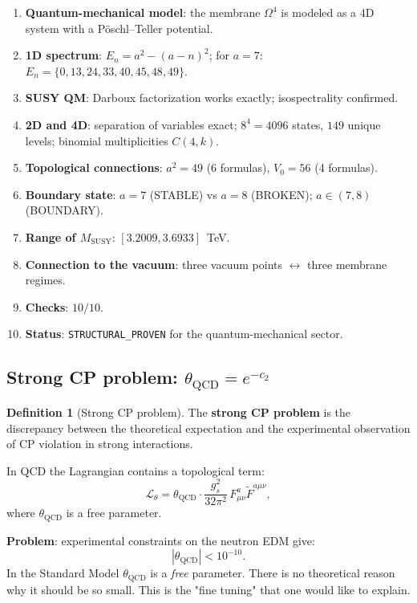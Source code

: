 \documentclass[11pt,a4paper]{article}
\newcommand{\Om}{\ensuremath{\Omega^4}}
\theoremstyle{definition}
\newtheorem{definition}[theorem]{Definition}
\begin{document}
\begin{enumerate}
    \item \textbf{Quantum-mechanical model}: the membrane $\Om$
          is modeled as a 4D system with a P\"oschl--Teller potential.
    \item \textbf{1D spectrum}: $E_n = a^2 - (a-n)^2$;
          for $a = 7$: $E_n = \{0, 13, 24, 33, 40, 45, 48, 49\}$.
    \item \textbf{SUSY QM}: Darboux factorization works exactly;
          isospectrality confirmed.
    \item \textbf{2D and 4D}: separation of variables exact;
          $8^4 = 4096$ states, $149$ unique levels;
          binomial multiplicities $C(4, k)$.
    \item \textbf{Topological connections}: $a^2 = 49$ (6 formulas),
          $V_0 = 56$ (4 formulas).
    \item \textbf{Boundary state}: $a = 7$ (STABLE) vs
          $a = 8$ (BROKEN); $a \in (7, 8)$ (BOUNDARY).
    \item \textbf{Range of $M_{\text{SUSY}}$}:
          $[3.2009, 3.6933]$~TeV.
    \item \textbf{Connection to the vacuum}: three vacuum points
          $\leftrightarrow$ three membrane regimes.
    \item \textbf{Checks}: $10/10$.
    \item \textbf{Status}: \texttt{STRUCTURAL\_PROVEN} for
          the quantum-mechanical sector.
\end{enumerate}
\subsection{Strong CP problem: \texorpdfstring{$\theta_{\text{QCD}} = e^{-c_2}$}{theta\_QCD = e\^{}-c\_2}}
\label{subsec:strong-cp}

\begin{definition}[Strong CP problem]
\label{def:strong-cp}
The \textbf{strong CP problem} is the discrepancy between the theoretical expectation
and the experimental observation of CP violation in strong interactions.

\medskip\noindent
In QCD the Lagrangian contains a topological term:
\begin{equation}
    \mathcal{L}_{\theta} = \theta_{\text{QCD}} \cdot
    \frac{g_s^2}{32\pi^2} \, F_{\mu\nu}^a \tilde{F}^{a\mu\nu},
    \label{eq:theta-term}
\end{equation}
where $\theta_{\text{QCD}}$ is a free parameter.

\medskip\noindent
\textbf{Problem}: experimental constraints on the neutron EDM give:
\begin{equation}
    |\theta_{\text{QCD}}| < 10^{-10}.
    \label{eq:theta-limit}
\end{equation}
In the Standard Model $\theta_{\text{QCD}}$ is a \emph{free} parameter.
There is no theoretical reason why it should be so small. This is the "fine
tuning" that one would like to explain.
\end{definition}
\end{document}
